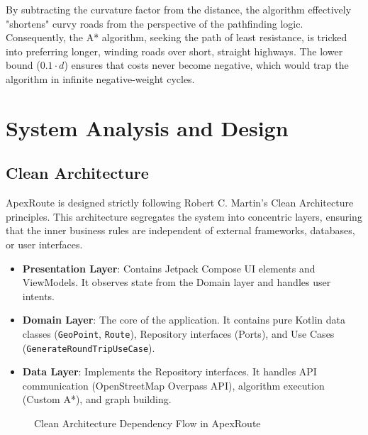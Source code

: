 \documentclass[12pt,a4paper,oneside]{report}
\begin{document}
By subtracting the curvature factor from the distance, the algorithm effectively "shortens" curvy roads from the perspective of the pathfinding logic. Consequently, the A* algorithm, seeking the path of least resistance, is tricked into preferring longer, winding roads over short, straight highways. The lower bound ($0.1 \cdot d$) ensures that costs never become negative, which would trap the algorithm in infinite negative-weight cycles.

\chapter{System Analysis and Design}

\section{Clean Architecture}
ApexRoute is designed strictly following Robert C. Martin's Clean Architecture principles. This architecture segregates the system into concentric layers, ensuring that the inner business rules are independent of external frameworks, databases, or user interfaces.

\begin{itemize}
    \item \textbf{Presentation Layer}: Contains Jetpack Compose UI elements and ViewModels. It observes state from the Domain layer and handles user intents.
    \item \textbf{Domain Layer}: The core of the application. It contains pure Kotlin data classes (\texttt{GeoPoint}, \texttt{Route}), Repository interfaces (Ports), and Use Cases (\texttt{GenerateRoundTripUseCase}).
    \item \textbf{Data Layer}: Implements the Repository interfaces. It handles API communication (OpenStreetMap Overpass API), algorithm execution (Custom A*), and graph building.
\end{itemize}

\begin{figure}[h]
\centering
{}
\caption{Clean Architecture Dependency Flow in ApexRoute}
\end{figure}
\end{document}
